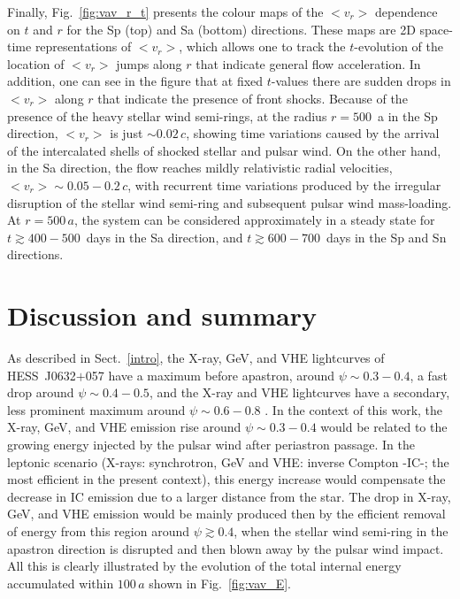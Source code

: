\documentclass[usenatbib]{mn2e}
\def\j06{{HESS~J0632$+$057}}
\begin{document}
Finally, Fig.~\ref{fig:vav_r_t} presents the colour maps of the $<v_r>$ dependence on $t$ and $r$ for the Sp (top) and Sa (bottom) directions. 
These maps are 2D space-time representations of $<v_r>$, which allows one to track the $t$-evolution of the location of $<v_r>$ jumps along $r$ that indicate general flow acceleration. In addition, one can see in the figure that at fixed $t$-values there are sudden drops in $<v_r>$ 
along $r$ that indicate the presence of front shocks. Because of the presence of the heavy 
stellar wind semi-rings, at the radius $r=500$~a in the Sp direction, $<v_r>$ is just $\sim 0.02\,c$, showing time variations caused by the arrival of 
the intercalated shells of shocked stellar and pulsar wind. On the other hand, in the Sa direction, the flow reaches mildly relativistic 
radial velocities, $<v_r>\sim 0.05-0.2\,c$, with recurrent time variations produced by the irregular disruption of the stellar wind semi-ring 
and subsequent pulsar wind mass-loading. At $r=500\,a$, the system can be considered approximately in a steady state for $t\gtrsim 400-500$~days 
in the Sa direction, and $t\gtrsim 600-700$~days in the Sp and Sn directions.

\section{Discussion and summary}\label{disc}

As described in Sect.~\ref{intro}, the X-ray, {GeV, and} VHE lightcurves of \j06 have a maximum before apastron, around $\psi\sim 0.3-0.4$, 
a fast drop around $\psi\sim 0.4-0.5$, and {the X-ray and VHE lightcurves have a} secondary, less prominent maximum around $\psi\sim 0.6-0.8$ \citep{ali14}. 
In the context of this work, the X-ray, {GeV,} and VHE emission rise around $\psi\sim 0.3-0.4$ 
would be related to the growing energy injected by the pulsar wind after periastron passage. 
In the leptonic scenario (X-rays: synchrotron, {GeV and} VHE: inverse Compton -IC-; the most efficient in the present context), this energy increase would compensate the decrease in IC emission due to a larger distance from the star. The drop in X-ray{, GeV,} and VHE emission would be mainly 
produced then by the efficient removal of energy from this region around $\psi\gtrsim 0.4$, when the stellar wind semi-ring in the apastron direction is 
disrupted and then blown away by the pulsar wind impact. All this is clearly illustrated by the evolution of the total internal energy 
accumulated within $100\,a$ shown in Fig.~\ref{fig:vav_E}. 
\end{document}
